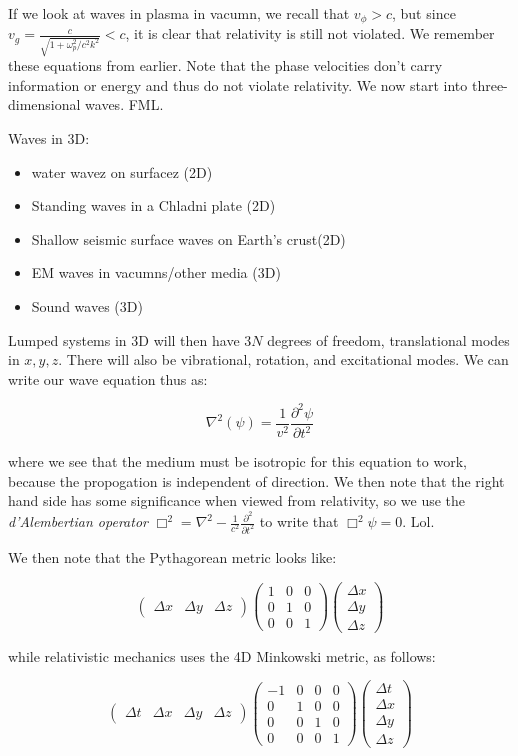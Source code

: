 \documentclass{report}
\begin{document}
If we look at waves in plasma in vacumn, we recall that $v_\phi > c$, but since $v_g = \frac{c}{\sqrt{1 + \omega_p^2/c^2k^2}} < c$, it is clear that relativity is still not violated. We remember these equations from earlier. Note that the phase velocities don't carry information or energy and thus do not violate relativity. We now start into three-dimensional waves. FML.

Waves in 3D:

\begin{itemize}
\item water wavez on surfacez (2D)
\item Standing waves in a Chladni plate (2D)
\item Shallow seismic surface waves on Earth's crust(2D)
\item EM waves in vacumns/other media (3D)
\item Sound waves (3D)
\end{itemize}

Lumped systems in 3D will then have $3N$ degrees of freedom, translational modes in $x,y,z$. There will also be vibrational, rotation, and excitational modes. We can write our wave equation thus as:

$$\nabla^2(\psi) = \frac{1}{v^2}\frac{\partial^2\psi}{\partial t^2}$$

where we see that the medium must be isotropic for this equation to work, because the propogation is independent of direction. We then note that the right hand side has some significance when viewed from relativity, so we use the \emph{d'Alembertian operator} $\Box^2 = \nabla^2 - \frac{1}{c^2}\frac{\partial^2}{\partial t^2}$ to write that $\Box^2\psi = 0$. Lol.

We then note that the Pythagorean metric looks like:

$$\begin{pmatrix}\Delta x & \Delta y & \Delta z\end{pmatrix}\begin{pmatrix}1&0&0\\0&1&0\\0&0&1\end{pmatrix}\begin{pmatrix}\Delta x\\\Delta y\\\Delta z\end{pmatrix}$$

while relativistic mechanics uses the 4D Minkowski metric, as follows:

$$\begin{pmatrix}\Delta t & \Delta x & \Delta y & \Delta z\end{pmatrix}\begin{pmatrix}-1&0&0&0\\0&1&0&0\\0&0&1&0 \\ 0&0&0&1\end{pmatrix}\begin{pmatrix}\Delta t\\\Delta x\\\Delta y\\\Delta z\end{pmatrix}$$
\end{document}
